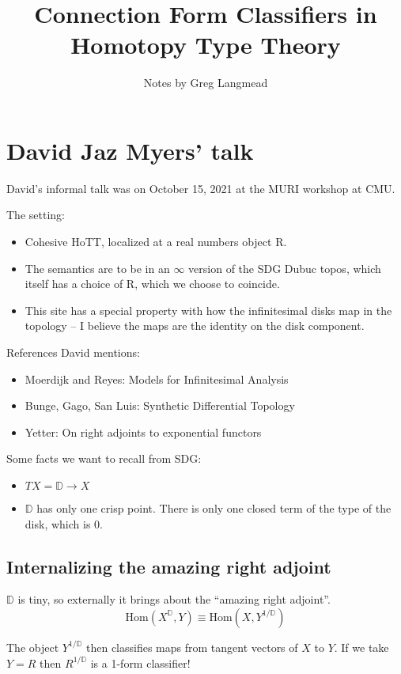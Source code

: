 \documentclass[17pt]{extarticle}
\title{Connection Form Classifiers in Homotopy Type Theory}
\begin{document}
\author{Notes by Greg Langmead}
\maketitle
\section{David Jaz Myers' talk}
David's informal talk was on October 15, 2021 at the MURI workshop at CMU.

The setting: \begin{itemize}
	\item Cohesive HoTT, localized at a real numbers object R. 
	\item The semantics are to be in an $\infty$ version of the SDG Dubuc topos, which itself has a choice of R, which we choose to coincide.
	\item This site has a special property with how the infinitesimal disks map in the topology -- I believe the maps are the identity on the disk component.
\end{itemize}

References David mentions:
\begin{itemize}
\item Moerdijk and Reyes: Models for Infinitesimal Analysis \cite{moerdijk2013models}
\item Bunge, Gago, San Luis: Synthetic Differential Topology \cite{bunge2018synthetic}
\item Yetter: On right adjoints to exponential functors \cite{yetter1987right}
\end{itemize}

Some facts we want to recall from SDG: 
\begin{itemize}
	\item $TX = \mathbb{D}\to X$
	\item $\mathbb{D}$ has only one crisp point. There is only one closed term of the type of the disk, which is 0.
\end{itemize}

\subsection{Internalizing the amazing right adjoint}

$\mathbb{D}$ is tiny, so externally it brings about the ``amazing right adjoint''. $$\mathrm{Hom}(X^{\mathbb{D}}, Y) \equiv \mathrm{Hom}(X, Y^{1/\mathbb{D}})$$ 

The object $Y^{1/\mathbb{D}}$ then classifies maps from tangent vectors of $X$ to $Y$. If we take $Y=R$ then $R^{1/\mathbb{D}}$ is a 1-form classifier!
\end{document}
